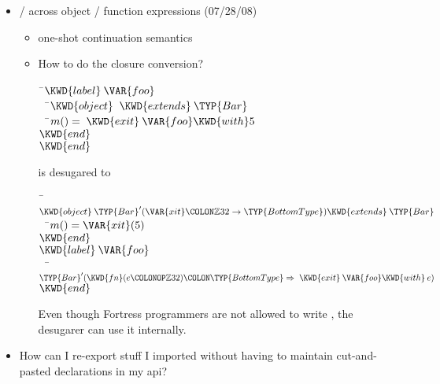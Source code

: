 \begin{itemize}
\item {} /  across object / function expressions (07/28/08)
  \begin{itemize}
\item one-shot continuation semantics
\item How to do the closure conversion?
\begin{Fortress}
{\tt~}\pushtabs\=\+\( \KWD{label}\:\VAR{foo}\)\\
{\tt~~}\pushtabs\=\+\(   \KWD{object}\;\;\KWD{extends}\:\TYP{Bar}\)\\
{\tt~~}\pushtabs\=\+\(     m() = \;\KWD{exit}\:\VAR{foo} \KWD{with} 5\)\-\\\poptabs
\(   \KWD{end}\)\-\\\poptabs
\( \KWD{end}\)\-\\\poptabs
\end{Fortress}
is desugared to
\begin{Fortress}
{\tt~}\pushtabs\=\+\( \KWD{object}\:\TYP{Bar}'(\VAR{xit}\COLON \mathbb{Z}32 \rightarrow \TYP{BottomType}) \KWD{extends}\:\TYP{Bar}\)\\
{\tt~~}\pushtabs\=\+\(   m() = \VAR{xit}(5)\)\-\\\poptabs
\( \KWD{end}\)\\
\( \KWD{label}\:\VAR{foo}\)\\
{\tt~~}\pushtabs\=\+\(   \TYP{Bar}'(\KWD{fn} (e\COLONOP\mathbb{Z}32)\COLON \TYP{BottomType} \Rightarrow\;\KWD{exit}\:\VAR{foo} \KWD{with}\:e)\)\-\\\poptabs
\( \KWD{end}\)\-\\\poptabs
\end{Fortress}
Even though Fortress programmers are not allowed to write ,
the desugarer can use it internally.
  \end{itemize}

\item How can I re-export stuff I
imported without having to maintain cut-and-pasted declarations in my api?




\end{itemize}
